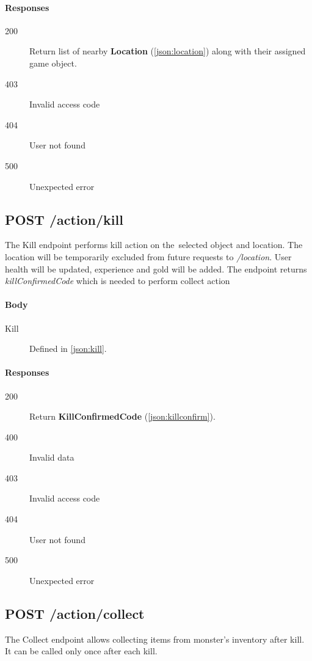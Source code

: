 		\paragraph*{Responses}
			\begin{description}
				\item[200] Return list of nearby \textbf{Location} (\ref{json:location}) along with their assigned game object.
				\item[403] Invalid access code
				\item[404] User not found
				\item[500] Unexpected error
			\end{description}
	
	\subsection{POST /action/kill}
	The Kill endpoint performs kill action on the~selected object and location. The location will be temporarily excluded from future requests to \textit{/location}. User health will be updated, experience and gold will be added. The endpoint returns \textit{killConfirmedCode} which is needed to perform collect action
		\paragraph*{Body}
			\begin{description}
				\item[Kill] Defined in \ref{json:kill}.
			\end{description}
		\paragraph*{Responses}
			\begin{description}
				\item[200] Return \textbf{KillConfirmedCode} (\ref{json:killconfirm}).
				\item[400] Invalid data
				\item[403] Invalid access code
				\item[404] User not found
				\item[500] Unexpected error
			\end{description}
	
	\subsection{POST /action/collect}
	The Collect endpoint allows collecting items from monster's inventory after kill. It can be called only once after each kill.
